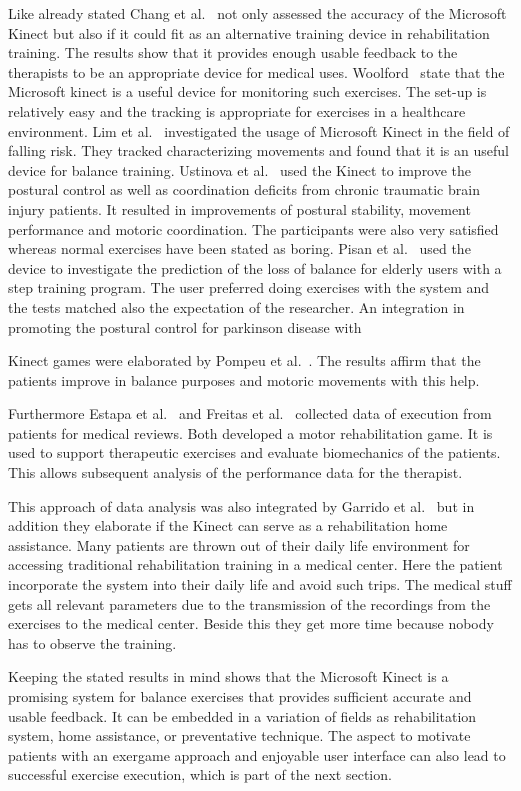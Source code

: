 Like already stated Chang et al.~\cite{Chang2012-hz} not only assessed the accuracy of the Microsoft Kinect but also if it could fit as an alternative training device in rehabilitation training. The results show that it provides enough usable feedback to the therapists to be an appropriate device for medical uses. Woolford~\cite{Woolford2015-ub} state that the Microsoft kinect is a useful device for monitoring such exercises. The set-up is relatively easy and the tracking is appropriate for exercises in a healthcare environment. Lim et al.~\cite{Lim2015-pw} investigated the usage of Microsoft Kinect in the field of falling risk. They tracked characterizing movements and found that it is an useful device for balance training. Ustinova et al.~\cite{Ustinova2014-ml} used the Kinect to improve the postural control as well as coordination deficits from chronic traumatic brain injury patients. It resulted in improvements of postural stability, movement performance and motoric coordination. The participants were also very satisfied whereas normal exercises have been stated as boring. Pisan et al.~\cite{Pisan2013-sf} used the device to investigate the prediction of the loss of balance for elderly users with a step training program. The user preferred doing exercises with the system and the tests matched also the expectation of the researcher. An integration in promoting the postural control for parkinson disease with 

Kinect games were elaborated by Pompeu et al.~\cite{Pompeu2014-yl, Pompeu2015-vp}. The results affirm that the patients improve in balance purposes and motoric movements with this help.

Furthermore Estapa et al.~\cite{Estepa2016-oj} and Freitas et al.~\cite{Freitas2012-ae} collected data of execution from patients for medical reviews. Both developed a motor rehabilitation game. It is used to support therapeutic exercises and evaluate biomechanics of the patients. This allows subsequent analysis of the performance data for the therapist.

This approach of data analysis was also integrated by Garrido et al.~\cite{Garrido2013-zs} but in addition they elaborate if the Kinect can serve as a rehabilitation home assistance. Many patients are thrown out of their daily life environment for accessing traditional rehabilitation training in a medical center. Here the patient incorporate the system into their daily life and avoid such trips. The medical stuff gets all relevant parameters due to the transmission of the recordings from the exercises to the medical center. Beside this they get more time because nobody has to observe the training.

Keeping the stated results in mind shows that the Microsoft Kinect is a promising system for balance exercises that provides sufficient accurate and usable feedback. It can be embedded in a variation of fields as rehabilitation system, home assistance, or preventative technique. The aspect to motivate patients with an exergame approach and enjoyable user interface can also lead to successful exercise execution, which is part of the next section.